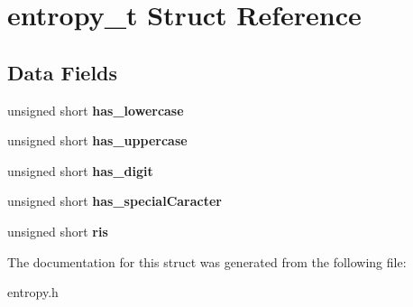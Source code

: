 \hypertarget{structentropy__t}{}\section{entropy\+\_\+t Struct Reference}
\label{structentropy__t}
\subsection*{Data Fields}
\begin{DoxyCompactItemize}
\item 
unsigned short {\bfseries has\+\_\+lowercase}\hypertarget{structentropy__t_af8e7085b51537e6aa4faf2b0d5fe4859}{}\label{structentropy__t_af8e7085b51537e6aa4faf2b0d5fe4859}

\item 
unsigned short {\bfseries has\+\_\+uppercase}\hypertarget{structentropy__t_ae09a535bfa11033dfb8822ea02391a1c}{}\label{structentropy__t_ae09a535bfa11033dfb8822ea02391a1c}

\item 
unsigned short {\bfseries has\+\_\+digit}\hypertarget{structentropy__t_ae07d0f45acccdce53c434539368e3244}{}\label{structentropy__t_ae07d0f45acccdce53c434539368e3244}

\item 
unsigned short {\bfseries has\+\_\+special\+Caracter}\hypertarget{structentropy__t_a06e9d7f548cff31b8fffc4724376f65a}{}\label{structentropy__t_a06e9d7f548cff31b8fffc4724376f65a}

\item 
unsigned short {\bfseries ris}\hypertarget{structentropy__t_a75e2e683205dd35ddc073d6b9d2efcb9}{}\label{structentropy__t_a75e2e683205dd35ddc073d6b9d2efcb9}

\end{DoxyCompactItemize}


The documentation for this struct was generated from the following file\+:\begin{DoxyCompactItemize}
\item 
entropy.\+h\end{DoxyCompactItemize}
